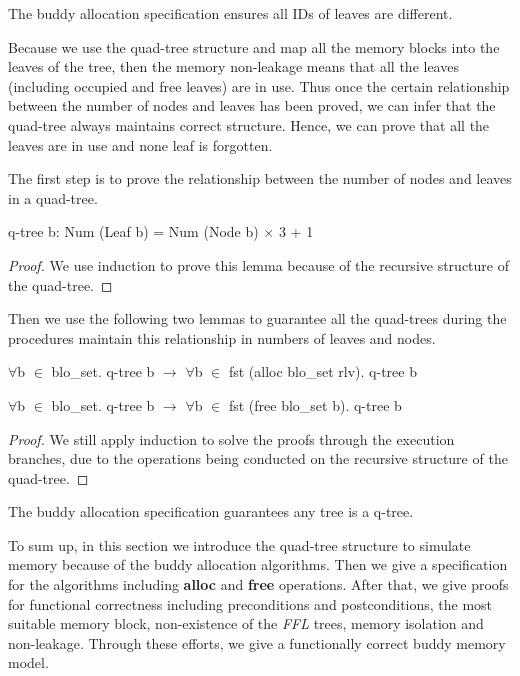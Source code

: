 \documentclass[runningheads]{llncs}
\begin{document}
\begin{theorem}
The buddy allocation specification ensures all IDs of leaves are different.
\end{theorem}

Because we use the quad-tree structure and map all the memory blocks into the leaves of the tree, then the memory non-leakage means that all the leaves (including occupied and free leaves) are in use. Thus once the certain relationship between the number of nodes and leaves has been proved, we can infer that the quad-tree always maintains correct structure. Hence, we can prove that all the leaves are in use and none leaf is forgotten.

The first step is to prove the relationship between the number of nodes and leaves in a quad-tree.

\begin{lemma}
q-tree b: Num (Leaf b) = Num (Node b) $\times$ 3 + 1
\end{lemma}

\begin{proof}
We use induction  to prove this lemma because of the recursive structure of the quad-tree.
\end{proof}

Then we use the following two lemmas to guarantee all the quad-trees during the procedures maintain this relationship in numbers of leaves and nodes.

\begin{lemma}
$\forall$b $\in$ blo\_set. q-tree b $\longrightarrow$ $\forall$b $\in$ fst (alloc blo\_set rlv). q-tree b
\end{lemma}

\begin{lemma}
$\forall$b $\in$ blo\_set. q-tree b $\longrightarrow$ $\forall$b $\in$ fst (free blo\_set b). q-tree b
\end{lemma}

\begin{proof}
We still apply induction to solve the proofs through the execution branches, due to the operations being conducted on the recursive structure of the quad-tree.
\end{proof}

\begin{theorem}
The buddy allocation specification guarantees any tree is a q-tree.
\end{theorem}

To sum up, in this section we introduce the quad-tree structure to simulate memory because of the buddy allocation algorithms. Then we give a specification for the algorithms including \textbf{alloc} and \textbf{free} operations. After that, we give proofs for functional correctness including preconditions and postconditions, the most suitable memory block, non-existence of the \emph{FFL} trees, memory isolation and non-leakage. Through these efforts, we give a functionally correct buddy memory model.
\end{document}
